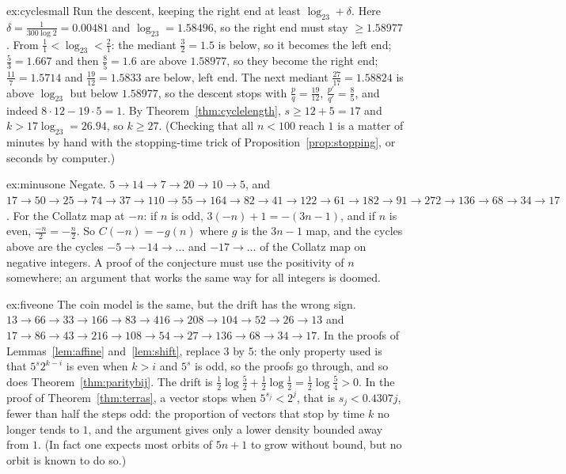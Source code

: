 \begin{solution}{ex:cyclesmall}
\idea Run the descent, keeping the right end at least $\log_23+\delta$.
\writeup Here $\delta=\frac1{300\log2}=0.00481$ and $\log_23=1.58496$, so the right end must stay $\ge1.58977$. From $\frac11<\log_23<\frac21$: the mediant
$\frac32=1.5$ is below, so it becomes the left end; $\frac53=1.667$ and then $\frac85=1.6$ are above $1.58977$, so they become the right end;
$\frac{11}7=1.5714$ and $\frac{19}{12}=1.5833$ are below, left end. The next mediant $\frac{27}{17}=1.58824$ is above $\log_23$ but below $1.58977$, so the
descent stops with $\frac pq=\frac{19}{12}$, $\frac{p'}{q'}=\frac85$, and indeed $8\cdot12-19\cdot5=1$. By Theorem~\ref{thm:cyclelength}, $s\ge12+5=17$ and
$k>17\log_23=26.94$, so $k\ge27$. (Checking that all $n<100$ reach $1$ is a matter of minutes by hand with the stopping-time trick of
Proposition~\ref{prop:stopping}, or seconds by computer.)
\end{solution}

\begin{solution}{ex:minusone}
\idea Negate.
\writeup $5\to14\to7\to20\to10\to5$, and $17\to50\to25\to74\to37\to110\to55\to164\to82\to41\to122\to61\to182\to91\to272\to136\to68\to34\to17$. For the
Collatz map at $-n$: if $n$ is odd, $3(-n)+1=-(3n-1)$, and if $n$ is even, $\frac{-n}2=-\frac n2$. So $C(-n)=-g(n)$ where $g$ is the $3n-1$ map, and
the cycles above are the cycles $-5\to-14\to\dots$ and $-17\to\dots$ of the Collatz map on negative integers. A proof of the conjecture must use the
positivity of $n$ somewhere; an argument that works the same way for all integers is doomed.
\end{solution}

\begin{solution}{ex:fiveone}
\idea The coin model is the same, but the drift has the wrong sign.
\writeup $13\to66\to33\to166\to83\to416\to208\to104\to52\to26\to13$ and $17\to86\to43\to216\to108\to54\to27\to136\to68\to34\to17$. In the proofs of
Lemmas~\ref{lem:affine} and~\ref{lem:shift}, replace $3$ by $5$: the only property used is that $5^{s}2^{k-i}$ is even when $k>i$ and $5^s$ is odd, so
the proofs go through, and so does Theorem~\ref{thm:paritybij}. The drift is $\frac12\log\frac52+\frac12\log\frac12=\frac12\log\frac54>0$. In the proof
of Theorem~\ref{thm:terras}, a vector stops when $5^{s_j}<2^j$, that is $s_j<0.4307j$, fewer than half the steps odd: the proportion of vectors that
stop by time $k$ no longer tends to $1$, and the argument gives only a lower density bounded away from $1$. (In fact one expects most orbits of $5n+1$ to
grow without bound, but no orbit is known to do so.)
\end{solution}

